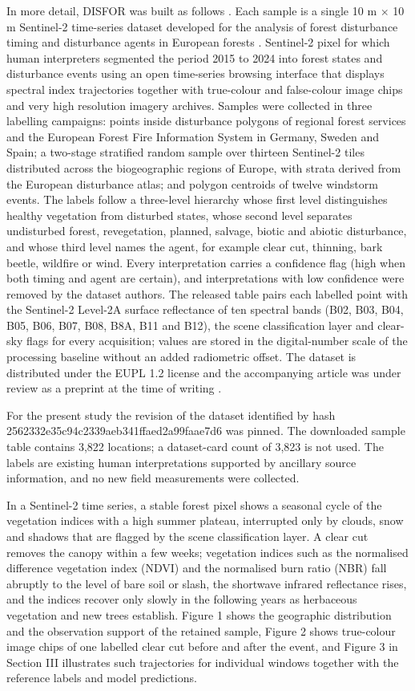 \documentclass[11pt,a4paper]{article}
\begin{document}
In more detail, DISFOR was built as follows \cite{ref1}. Each sample is a single 10 m $\times$ 10 m Sentinel-2 time-series dataset developed for the analysis of forest disturbance timing and disturbance agents in European forests \cite{ref1}. Sentinel-2 pixel for which human interpreters segmented the period 2015 to 2024 into forest states and disturbance events using an open time-series browsing interface that displays spectral index trajectories together with true-colour and false-colour image chips and very high resolution imagery archives. Samples were collected in three labelling campaigns: points inside disturbance polygons of regional forest services and the European Forest Fire Information System in Germany, Sweden and Spain; a two-stage stratified random sample over thirteen Sentinel-2 tiles distributed across the biogeographic regions of Europe, with strata derived from the European disturbance atlas; and polygon centroids of twelve windstorm events. The labels follow a three-level hierarchy whose first level distinguishes healthy vegetation from disturbed states, whose second level separates undisturbed forest, revegetation, planned, salvage, biotic and abiotic disturbance, and whose third level names the agent, for example clear cut, thinning, bark beetle, wildfire or wind. Every interpretation carries a confidence flag (high when both timing and agent are certain), and interpretations with low confidence were removed by the dataset authors. The released table pairs each labelled point with the Sentinel-2 Level-2A surface reflectance of ten spectral bands (B02, B03, B04, B05, B06, B07, B08, B8A, B11 and B12), the scene classification layer and clear-sky flags for every acquisition; values are stored in the digital-number scale of the processing baseline without an added radiometric offset. The dataset is distributed under the EUPL 1.2 license and the accompanying article was under review as a preprint at the time of writing \cite{ref1}.

For the present study the revision of the dataset identified by hash 2562332e35c94c2339aeb341ffaed2a99faae7d6 was pinned. The downloaded sample table contains 3,822 locations; a dataset-card count of 3,823 is not used. The labels are existing human interpretations supported by ancillary source information, and no new field measurements were collected.

In a Sentinel-2 time series, a stable forest pixel shows a seasonal cycle of the vegetation indices with a high summer plateau, interrupted only by clouds, snow and shadows that are flagged by the scene classification layer. A clear cut removes the canopy within a few weeks; vegetation indices such as the normalised difference vegetation index (NDVI) and the normalised burn ratio (NBR) fall abruptly to the level of bare soil or slash, the shortwave infrared reflectance rises, and the indices recover only slowly in the following years as herbaceous vegetation and new trees establish. Figure 1 shows the geographic distribution and the observation support of the retained sample, Figure 2 shows true-colour image chips of one labelled clear cut before and after the event, and Figure 3 in Section III illustrates such trajectories for individual windows together with the reference labels and model predictions.
\end{document}
